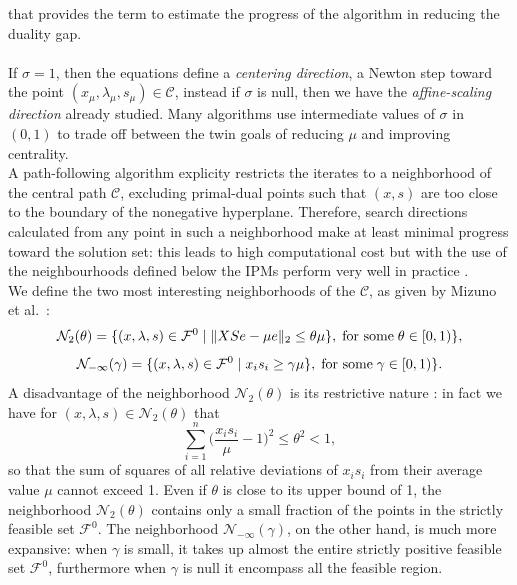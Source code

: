 \documentclass[a4paper,10 pt,titlepage,twoside]{book}
\theoremstyle{plain}
\theoremstyle{definition}
\theoremstyle{remark}
\begin{document}
 that provides the term to estimate the progress of the
 algorithm in reducing the duality gap.\\  
 \\
If $\sigma = 1$, then the equations define a \textit{centering direction}, a Newton step toward the point $(x_{\mu},\lambda_{\mu}, s_{\mu})\in\mathcal{C}$, instead if $\sigma$ is null, then we have the \textit{affine-scaling direction} already studied. Many algorithms use intermediate values of $\sigma$ in $(0,1)$ to trade off between the twin goals of reducing $\mu$ and improving centrality. 
\\ A path-following algorithm explicity restricts the iterates to a neighborhood of the central path $\mathcal{C}$, excluding primal-dual points such that $(x, s)$ are too close to the boundary of the nonegative hyperplane. Therefore, search directions calculated from any point in such a neighborhood make at least minimal progress toward the solution set: this leads to high computational cost but with the use of the neighbourhoods defined below the IPMs perform
very well in practice \cite{25y}.\\
 We define the two most interesting neighborhoods of the $\mathcal{C}$, as given
by Mizuno et al.~\cite{5}:\\
\begin{equation*}
\mathcal{N}_{2}(\theta) =\{(x, \lambda,s)\in\mathcal{F}^{0} \;|\;\lVert XSe - \mu e \rVert_{2} \leq \theta \mu \}, \text{\;for some\;} \theta \in [0,1)\},
\end{equation*} 
\begin{equation*}
\mathcal{N}_{-\infty}(\gamma) =\{ (x, \lambda,s)\in\mathcal{F}^{0} \;|\; x_{i}s_{i} \geq \gamma \mu \}, \text{\;for some\;} \gamma \in [0,1)\}.
\end{equation*} 
A disadvantage of the neighborhood $\mathcal{N}_{2}(\theta)$ is its restrictive nature \cite{W}:  in fact we have for $(x, \lambda,s)\in\mathcal{N}_{2}(\theta)$ that
\begin{equation*}
\sum\limits_{i=1}^{n}\bigg(\frac{x_{i}s_{i}}{\mu}-1\bigg)^{2}\leq \theta^{2}<1,
\end{equation*} 
so that the sum of squares of all relative deviations of $x_{i}s_{i}$ from their average value $\mu$ cannot exceed 1. Even if $\theta$ is close to its upper bound of 1, the neighborhood $\mathcal{N}_{2}(\theta)$ contains only a small fraction of the points in the strictly feasible set $\mathcal{F}^{0}$. The neighborhood $\mathcal{N}_{-\infty}(\gamma)$, on the other hand, is much more expansive: when $\gamma$ is small, it takes up almost the entire strictly positive feasible set $\mathcal{F}^{0}$, furthermore when $\gamma$ is null it encompass all the
feasible region.
\end{document}
